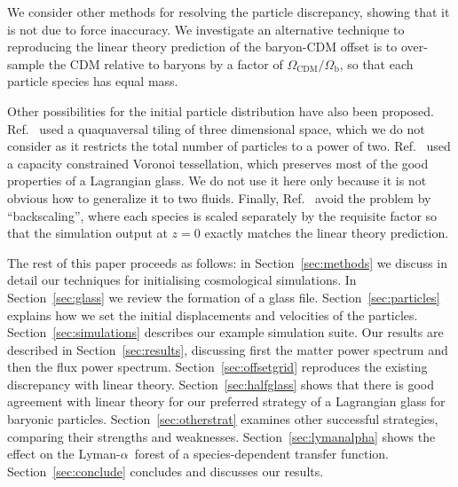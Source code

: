 \documentclass[a4paper,11pt]{article}
\newcommand{\Lya}{Lyman-$\alpha$}
\begin{document}
We consider other methods for resolving the particle discrepancy, showing that it is not due to force inaccuracy. We investigate an alternative technique to reproducing the linear theory prediction of the baryon-CDM offset is to over-sample the CDM relative to baryons by a factor of $\Omega_\mathrm{CDM}/\Omega_\mathrm{b}$, so that each particle species has equal mass.


Other possibilities for the initial particle distribution have also been proposed. Ref.~\cite{Hansen:2007} used a quaquaversal tiling of three dimensional space, which we do not consider as it restricts the total number of particles to a power of two. Ref.~\cite{Liao:2018} used a capacity constrained Voronoi tessellation, which preserves most of the good properties of a Lagrangian glass. We do not use it here only because it is not obvious how to generalize it to two fluids. Finally, Ref.~\cite{Zennaro:2017} avoid the problem by ``backscaling'', where each species is scaled separately by the requisite factor so that the simulation output at $z=0$ exactly matches the linear theory prediction.

The rest of this paper proceeds as follows: in Section~\ref{sec:methods} we discuss in detail our techniques for initialising cosmological simulations. In Section~\ref{sec:glass} we review the formation of a glass file. Section~\ref{sec:particles} explains how we set the initial displacements and velocities of the particles. Section~\ref{sec:simulations} describes our example simulation suite. Our results are described in Section~\ref{sec:results}, discussing first the matter power spectrum and then the flux power spectrum.  Section~\ref{sec:offsetgrid} reproduces the existing discrepancy with linear theory. Section~\ref{sec:halfglass} shows that there is good agreement with linear theory for our preferred strategy of a Lagrangian glass for baryonic particles. Section~\ref{sec:otherstrat} examines other successful strategies, comparing their strengths and weaknesses. Section~\ref{sec:lymanalpha} shows the effect on the \Lya~forest of a species-dependent transfer function.
Section~\ref{sec:conclude} concludes and discusses our results.
\end{document}
